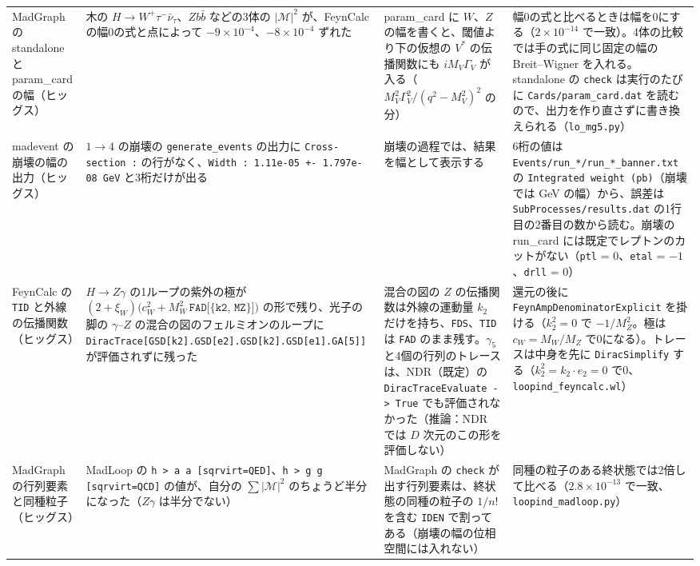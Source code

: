 \documentclass[a4paper,10pt]{ltjsarticle}
\begin{document}
\begin{table}[tbp]
\begin{tabularx}{\linewidth}{>{\raggedright\arraybackslash}p{2.4cm}>{\raggedright\arraybackslash}X>{\raggedright\arraybackslash}X>{\raggedright\arraybackslash}X}
MadGraph の standalone と param\_card の幅（ヒッグス） & 木の $H\to W^+\tau^-\bar\nu_\tau$、$Zb\bar b$ などの3体の $|\mathcal M|^2$ が、FeynCalc の幅0の式と点によって $-9\times10^{-4}$、$-8\times10^{-4}$ ずれた & param\_card に $W$、$Z$ の幅を書くと、閾値より下の仮想の $V^*$ の伝播関数にも $iM_V\Gamma_V$ が入る（$M_V^2\Gamma_V^2/(q^2-M_V^2)^2$ の分） & 幅0の式と比べるときは幅を0にする（$2\times10^{-14}$ で一致）。4体の比較では手の式に同じ固定の幅の Breit--Wigner を入れる。standalone の \texttt{check} は実行のたびに \texttt{Cards/param\_card.dat} を読むので、出力を作り直さずに書き換えられる（\texttt{lo\_mg5.py}） \\
madevent の崩壊の幅の出力（ヒッグス） & $1\to4$ の崩壊の \texttt{generate\_events} の出力に \texttt{Cross-section :} の行がなく、\texttt{Width : 1.11e-05}\allowbreak\texttt{ +- 1.797e-08 GeV} と3桁だけが出る & 崩壊の過程では、結果を幅として表示する & 6桁の値は \texttt{Events/run\_*/}\allowbreak\texttt{run\_*\_banner.txt} の \texttt{Integrated weight (pb)}（崩壊では GeV の幅）から、誤差は \texttt{SubProcesses/}\allowbreak\texttt{results.dat} の1行目の2番目の数から読む。崩壊の run\_card には既定でレプトンのカットがない（\texttt{ptl} = 0、\texttt{etal} = $-1$、\texttt{drll} = 0） \\
FeynCalc の \texttt{TID} と外線の伝播関数（ヒッグス） & $H\to Z\gamma$ の1ループの紫外の極が $(2+\xi_W)\bigl(c_W^2+M_W^2\,\texttt{FAD[\{k2, MZ\}]}\bigr)$ の形で残り、光子の脚の $\gamma$--$Z$ の混合の図のフェルミオンのループに \texttt{DiracTrace[GSD[k2].}\allowbreak\texttt{GSD[e2].GSD[k2].}\allowbreak\texttt{GSD[e1].GA[5]]} が評価されずに残った & 混合の図の $Z$ の伝播関数は外線の運動量 $k_2$ だけを持ち、\texttt{FDS}、\texttt{TID} は \texttt{FAD} のまま残す。$\gamma_5$ と4個の行列のトレースは、NDR（既定）の \texttt{DiracTraceEvaluate -> True} でも評価されなかった（推論：NDR では $D$ 次元のこの形を評価しない） & 還元の後に \texttt{FeynAmpDenominatorExplicit} を掛ける（$k_2^2=0$ で $-1/M_Z^2$。極は $c_W=M_W/M_Z$ で0になる）。トレースは中身を先に \texttt{DiracSimplify} する（$k_2^2=k_2\cdot e_2=0$ で0、\texttt{loopind\_feyncalc.wl}） \\
MadGraph の行列要素と同種粒子（ヒッグス） & MadLoop の \texttt{h > a a [sqrvirt=QED]}、\texttt{h > g g [sqrvirt=QCD]} の値が、自分の $\sum|\mathcal M|^2$ のちょうど半分になった（$Z\gamma$ は半分でない） & MadGraph の \texttt{check} が出す行列要素は、終状態の同種の粒子の $1/n!$ を含む \texttt{IDEN} で割ってある（崩壊の幅の位相空間には入れない） & 同種の粒子のある終状態では2倍して比べる（$2.8\times10^{-13}$ で一致、\texttt{loopind\_madloop.py}） \\

\end{tabularx}
\end{table}
\end{document}
